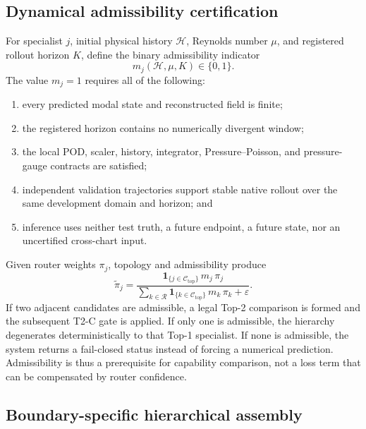 \subsection{Dynamical admissibility certification}
\label{subsec:admissibility_certification}

For specialist $j$, initial physical history $\mathcal{H}$, Reynolds number
$\mu$, and registered rollout horizon $K$, define the binary admissibility
indicator
\begin{equation}
  m_j(\mathcal{H},\mu,K)\in\{0,1\}.
  \label{eq:admissibility_indicator}
\end{equation}
The value $m_j=1$ requires all of the following:
\begin{enumerate}
  \item every predicted modal state and reconstructed field is finite;
  \item the registered horizon contains no numerically divergent window;
  \item the local POD, scaler, history, integrator, Pressure--Poisson,
        and pressure-gauge contracts are satisfied;
  \item independent validation trajectories support stable native rollout
        over the same development domain and horizon; and
  \item inference uses neither test truth, a future endpoint, a future state,
        nor an uncertified cross-chart input.
\end{enumerate}
Given router weights $\pi_j$, topology and admissibility produce
\begin{equation}
  \widetilde{\pi}_j
  =
  \frac{
    \mathbf{1}_{\{j\in\mathcal{C}_{\mathrm{top}}\}}\,
    m_j\,\pi_j
  }{
    \sum_{k\in\mathcal{R}}
    \mathbf{1}_{\{k\in\mathcal{C}_{\mathrm{top}}\}}\,
    m_k\,\pi_k+\varepsilon
  }.
  \label{eq:masked_router_weights}
\end{equation}
If two adjacent candidates are admissible, a legal Top-2 comparison is
formed and the subsequent T2-C gate is applied.  If only one is admissible,
the hierarchy degenerates deterministically to that Top-1 specialist.  If
none is admissible, the system returns a fail-closed status instead of
forcing a numerical prediction.  Admissibility is thus a prerequisite for
capability comparison, not a loss term that can be compensated by router
confidence.



\subsection{Boundary-specific hierarchical assembly}
\label{subsec:boundary_specific_assembly}


